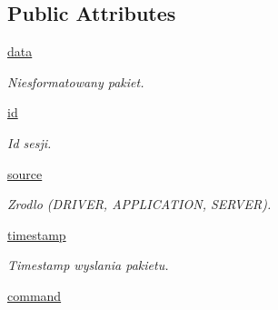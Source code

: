 \subsection*{Public Attributes}
\begin{CompactItemize}
\item 
\hypertarget{class_serv_1_1_packet_1_1_packet_5c1fb13da3486f574c94aaac06f3c56c}{
\hyperlink{class_serv_1_1_packet_1_1_packet_5c1fb13da3486f574c94aaac06f3c56c}{data}}
\label{class_serv_1_1_packet_1_1_packet_5c1fb13da3486f574c94aaac06f3c56c}

\begin{CompactList}\small\item\em Niesformatowany pakiet. \item\end{CompactList}\item 
\hypertarget{class_serv_1_1_packet_1_1_packet_5cc00710f6a12b310f6b69d88ed51c55}{
\hyperlink{class_serv_1_1_packet_1_1_packet_5cc00710f6a12b310f6b69d88ed51c55}{id}}
\label{class_serv_1_1_packet_1_1_packet_5cc00710f6a12b310f6b69d88ed51c55}

\begin{CompactList}\small\item\em Id sesji. \item\end{CompactList}\item 
\hypertarget{class_serv_1_1_packet_1_1_packet_37864cf9c1e11502ff340f0068ffa7f9}{
\hyperlink{class_serv_1_1_packet_1_1_packet_37864cf9c1e11502ff340f0068ffa7f9}{source}}
\label{class_serv_1_1_packet_1_1_packet_37864cf9c1e11502ff340f0068ffa7f9}

\begin{CompactList}\small\item\em Zrodlo (DRIVER, APPLICATION, SERVER). \item\end{CompactList}\item 
\hypertarget{class_serv_1_1_packet_1_1_packet_f7df973d840761ea9884fdffd800dc27}{
\hyperlink{class_serv_1_1_packet_1_1_packet_f7df973d840761ea9884fdffd800dc27}{timestamp}}
\label{class_serv_1_1_packet_1_1_packet_f7df973d840761ea9884fdffd800dc27}

\begin{CompactList}\small\item\em Timestamp wyslania pakietu. \item\end{CompactList}\item 
\hypertarget{class_serv_1_1_packet_1_1_packet_8a1139cb536fdc04312e50fbeb8e95a0}{
\hyperlink{class_serv_1_1_packet_1_1_packet_8a1139cb536fdc04312e50fbeb8e95a0}{command}}
\label{class_serv_1_1_packet_1_1_packet_8a1139cb536fdc04312e50fbeb8e95a0}


\end{CompactItemize}
